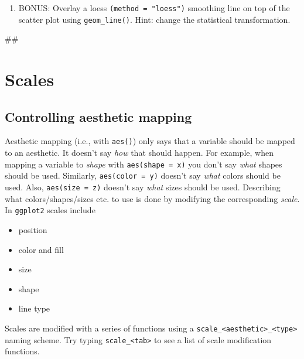 \documentclass[]{book}
\newenvironment{Shaded}{\begin{snugshade}}{\end{snugshade}}
\newcommand{\NormalTok}[1]{#1}
\providecommand{\tightlist}{%
  \setlength{\itemsep}{0pt}\setlength{\parskip}{0pt}}
\begin{document}
\begin{enumerate}
\def\labelenumi{\arabic{enumi}.}
\setcounter{enumi}{4}
\tightlist
\item
  BONUS: Overlay a loess \texttt{(method\ =\ "loess")} smoothing line on
  top of the scatter plot using \texttt{geom\_line()}. Hint: change the
  statistical transformation.
\end{enumerate}

\begin{Shaded}
\begin{Highlighting}[]
\NormalTok{## }
\end{Highlighting}
\end{Shaded}

\section{Scales}\label{scales}

\subsection{Controlling aesthetic
mapping}\label{controlling-aesthetic-mapping}

Aesthetic mapping (i.e., with \texttt{aes()}) only says that a variable
should be mapped to an aesthetic. It doesn't say \emph{how} that should
happen. For example, when mapping a variable to \emph{shape} with
\texttt{aes(shape\ =\ x)} you don't say \emph{what} shapes should be
used. Similarly, \texttt{aes(color\ =\ y)} doesn't say \emph{what}
colors should be used. Also, \texttt{aes(size\ =\ z)} doesn't say
\emph{what} sizes should be used. Describing what colors/shapes/sizes
etc. to use is done by modifying the corresponding \emph{scale}. In
\texttt{ggplot2} scales include

\begin{itemize}
\tightlist
\item
  position
\item
  color and fill
\item
  size
\item
  shape
\item
  line type
\end{itemize}

Scales are modified with a series of functions using a
\texttt{scale\_\textless{}aesthetic\textgreater{}\_\textless{}type\textgreater{}}
naming scheme. Try typing \texttt{scale\_\textless{}tab\textgreater{}}
to see a list of scale modification functions.
\end{document}
